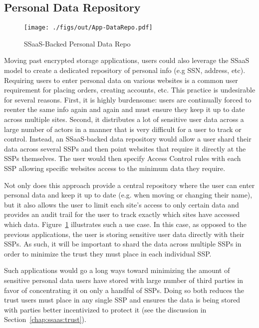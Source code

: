 \subsection{Personal Data Repository}

\begin{figure}[t]
  \centering
  \texttt{[image: ./figs/out/App-DataRepo.pdf]}
  \caption{SSaaS-Backed Personal Data Repo}
  \label{fig:apps-datarepo}
\end{figure}

Moving past encrypted storage applications, users could also leverage
the SSaaS model to create a dedicated repository of personal info (e.g
SSN, address, etc). Requiring users to enter personal data on various
websites is a common user requirement for placing orders, creating
accounts, etc. This practice is undesirable for several
reasons. First, it is highly burdensome: users are continually forced
to reenter the same info again and again and must ensure they keep it
up to date across multiple sites. Second, it distributes a lot of
sensitive user data across a large number of actors in a manner that
is very difficult for a user to track or control. Instead, an
SSaaS-backed data repository would allow a user shard their data
across several SSPs and then point websites that require it directly
at the SSPs themselves. The user would then specify Access Control
rules with each SSP allowing specific websites access to the minimum
data they require.

Not only does this approach provide a central repository where the
user can enter personal data and keep it up to date (e.g. when moving
or changing their name), but it also allows the user to limit each
site's access to only certain data and provides an audit trail for the
user to track exactly which sites have accessed which
data. Figure~\ref{fig:apps-datarepo} illustrates such a use case. In
this case, as opposed to the previous applications, the user is
storing sensitive user data directly with their SSPs. As such, it will
be important to shard the data across multiple SSPs in order to
minimize the trust they must place in each individual SSP.

Such applications would go a long ways toward minimizing the amount of
sensitive personal data users have stored with large number of third
parties in favor of concentrating it on only a handful of SSPs. Doing
so both reduces the trust users must place in any single SSP and
ensures the data is being stored with parties better incentivized to
protect it (see the discussion in Section~\ref{chap:ssaas:trust}).

